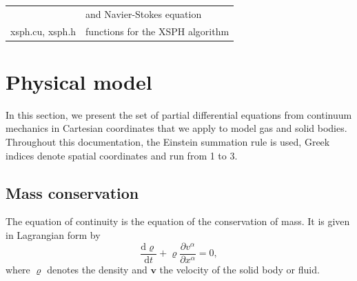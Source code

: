 \documentclass[10pt,fleqn,twoside]{article}
\newcommand{\vect}[1]{{\mathbf #1}}
\begin{document}
\begin{table}
\begin{tabular}[b]{p{6cm} p{9cm}}
                                                                & and Navier-Stokes equation                                                                                                                                                                                                                                                                                                                                 \\
  xsph.cu, xsph.h                                               & functions for the XSPH algorithm                                                                                                                                                                                                                                                                                                                           \\
  \hline
 \end{tabular}
 \label{tab:file-list}
\end{table}



\section{Physical model}
In this section, we present the set of partial differential equations from continuum mechanics in Cartesian coordinates
that we apply to model gas and solid bodies.
Throughout this documentation, the Einstein summation rule is used, Greek indices denote spatial coordinates and run from 1 to
3.
\subsection{Mass conservation}
The equation of continuity is the equation of the conservation of mass. It is given in Lagrangian form by
\begin{equation}
 \label{eq:conservation_of_mass}
 \frac{\mathrm{d} \varrho}{\mathrm{d}t} + \varrho \frac{\partial v^\alpha}{\partial x^\alpha} = 0,
\end{equation}
where $\varrho$ denotes the density and $\vect{v}$ the velocity of the solid body or fluid.
\end{document}
